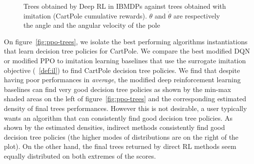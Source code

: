 \begin{figure}[htbp]
    \caption{Trees obtained by Deep RL in IBMDPs against trees obtained with imitation (CartPole cumulative rewards). $\theta$ and $\dot{\theta}$ are respectively the angle and the angular velocity of the pole}
    \label{fig:trees-drl}
\end{figure}


On figure~\ref{fig:ppo-trees}, we isolate the best performing algorithms instantiations that learn decision tree policies for CartPole.
We compare the best modified DQN or modified PPO to imitation learning baselines that use the surrogate imitation objective (~\ref{def:il}) to find CartPole decision tree policies.
We find that despite having poor performances in \textit{average}, the modified deep reinforcement learning baselines can find very good decision tree policies as shown by the min-max shaded areas on the left of figure~\ref{fig:ppo-trees} and the corresponding estimated density of final trees performances.
However this is not desirable, a user typically wants an algorithm that can consistently find good decision tree policies.
As shown by the estimated densities, indirect methods consistently find good decision tree policies (the higher modes of distributions are on the right of the plot).
On the other hand, the final trees returned by direct RL methods seem equally distributed on both extremes of the scores.

